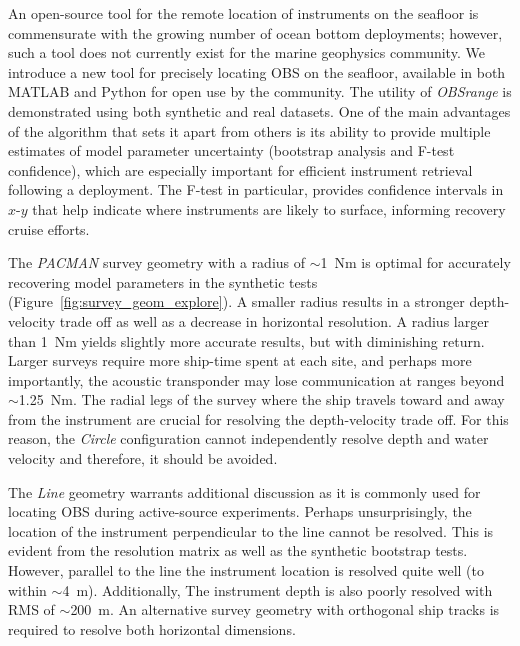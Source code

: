 An open-source tool for the remote location of instruments on the seafloor is commensurate with the growing number of ocean bottom deployments; however, such a tool does not currently exist for the marine geophysics community. We introduce a new tool for precisely locating OBS on the seafloor, available in both MATLAB and Python for open use by the community. The utility of \textit{OBSrange} is demonstrated using both synthetic and real datasets. One of the main advantages of the algorithm that sets it apart from others is its ability to provide multiple estimates of model parameter uncertainty (bootstrap analysis and F-test confidence), which are especially important for efficient instrument retrieval following a deployment. The F-test in particular, provides confidence intervals in $x$-$y$ that help indicate where instruments are likely to surface, informing recovery cruise efforts.

The \textit{PACMAN} survey geometry with a radius of $\sim$1~Nm is optimal for accurately recovering model parameters in the synthetic tests (Figure~\ref{fig:survey_geom_explore}). A smaller radius results in a stronger depth-velocity trade off as well as a decrease in horizontal resolution. A radius larger than 1~Nm yields slightly more accurate results, but with diminishing return. Larger surveys require more ship-time spent at each site, and perhaps more importantly, the acoustic transponder may lose communication at ranges beyond $\sim$1.25~Nm. The radial legs of the survey where the ship travels toward and away from the instrument are crucial for resolving the depth-velocity trade off. For this reason, the \textit{Circle} configuration cannot independently resolve depth and water velocity and therefore, it should be avoided.

The \textit{Line} geometry warrants additional discussion as it is commonly used for locating OBS during active-source experiments. Perhaps unsurprisingly, the location of the instrument perpendicular to the line cannot be resolved. This is evident from the resolution matrix as well as the synthetic bootstrap tests. However, parallel to the line the instrument location is resolved quite well (to within $\sim$4~m). Additionally, The instrument depth is also poorly resolved with RMS of $\sim$200~m. An alternative survey geometry with orthogonal ship tracks is required to resolve both horizontal dimensions.

